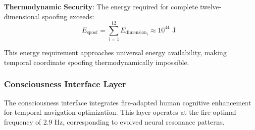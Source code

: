\documentclass[12pt,a4paper]{article}
\begin{document}
\textbf{Thermodynamic Security}: The energy required for complete twelve-dimensional spoofing exceeds:
$$E_{\text{spoof}} = \sum_{i=1}^{12} E_{\text{dimension}_i} \approx 10^{44} \text{ J}$$

This energy requirement approaches universal energy availability, making temporal coordinate spoofing thermodynamically impossible.

\subsubsection{Consciousness Interface Layer}

The consciousness interface integrates fire-adapted human cognitive enhancement for temporal navigation optimization. This layer operates at the fire-optimal frequency of 2.9 Hz, corresponding to evolved neural resonance patterns.
\end{document}
